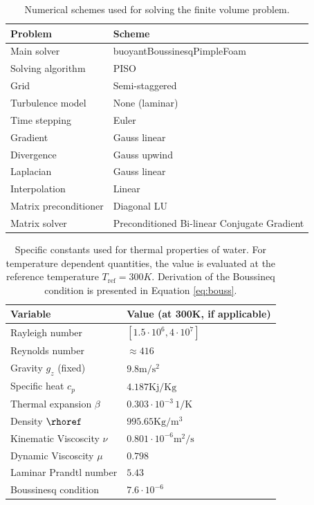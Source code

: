 \begin{table}
\begin{center}
\begin{tabular}{ll}
\hline
Problem & Scheme\\
\hline
\hline
Main solver & buoyantBoussinesqPimpleFoam\\
\hline
Solving algorithm & PISO\\
\hline
Grid & Semi-staggered\\
\hline
Turbulence model & None (laminar)\\
\hline
Time stepping & Euler\\
\hline
Gradient & Gauss linear\\
\hline
Divergence & Gauss upwind\\
\hline
Laplacian & Gauss linear\\
\hline
Interpolation & Linear\\
\hline
Matrix preconditioner & Diagonal LU\\
\hline
Matrix solver & Preconditioned Bi-linear Conjugate Gradient\\
\hline
\end{tabular}
\caption{
  Numerical schemes used for solving the finite volume problem.
  }
\label{tb:ofsolution}
\end{center}
\end{table}

\begin{table}
\begin{center}
\begin{tabular}{ll}
\hline
Variable & Value (at 300K, if applicable)\\
\hline
\hline
Rayleigh number & $[1.5\cdot 10^6, 4\cdot 10^7]$\\
\hline
Reynolds number & $\approx 416$\\
\hline
Gravity $g_z$ (fixed) & $9.8 \text{m}/\text{s}^2$\\
\hline
Specific heat $c_p$ & $4.187 \text{Kj}/\text{Kg}$\\
\hline
Thermal expansion $\beta$ & $0.303\cdot 10^{-3} \,1/\text{K}$\\
\hline
Density $\rhoref$ & $995.65 \text{Kg}/\text{m}^3$\\
\hline
Kinematic Viscoscity $\nu$ & $0.801\cdot 10^{-6} \text{m}^2/\text{s}$\\
\hline
Dynamic Viscoscity $\mu$ & $0.798$\\
\hline
Laminar Prandtl number & $5.43$\\
\hline
Boussinesq condition & $7.6\cdot 10^{-6}$\\
\hline
\end{tabular}
\caption{
  Specific constants used for thermal properties of water.
  For temperature dependent quantities, the value is evaluated at the reference temperature $T_\text{ref}  = 300K$.
  Derivation of the Boussineq condition is presented in Equation \ref{eq:bouss}.
  }
\label{tb:flowvariables}
\end{center}
\end{table}










